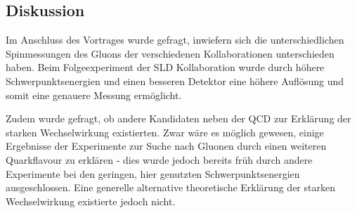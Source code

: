 \subsection{Diskussion}
Im Anschluss des Vortrages wurde gefragt, inwiefern sich die unterschiedlichen Spinmessungen des Gluons der verschiedenen Kollaborationen unterschieden haben.
Beim Folgeexperiment der SLD Kollaboration wurde durch höhere Schwerpunktsenergien und einen besseren Detektor eine höhere Auflösung und somit eine genauere Messung ermöglicht.

Zudem wurde gefragt, ob andere Kandidaten neben der QCD zur Erklärung der starken Wechselwirkung existierten.
Zwar wäre es möglich gewesen, einige Ergebnisse der Experimente zur Suche nach Gluonen durch einen weiteren Quarkflavour zu erklären - dies wurde jedoch bereits früh durch andere Experimente bei den geringen, hier genutzten Schwerpunktsenergien ausgeschlossen.
Eine generelle alternative theoretische Erklärung der starken Wechselwirkung existierte jedoch nicht.